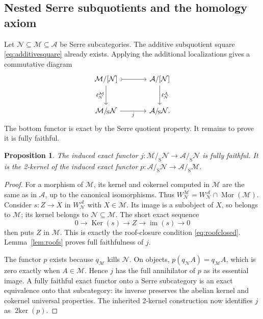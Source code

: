 \documentclass[11pt,reqno,a4paper]{amsart}
\newtheorem{proposition}[theorem]{Proposition}
\theoremstyle{definition}
\theoremstyle{remark}
\newcommand{\A}{\mathcal{A}}
\newcommand{\M}{\mathcal{M}}
\newcommand{\N}{\mathcal{N}}
\newcommand{\0}{\mathbf{0}}
\renewcommand{\1}{\mathbf{1}}
\newcommand{\twoker}{\operatorname{2ker}}
\newcommand{\aq}[2]{#1/[#2]}
\newcommand{\sq}[2]{#1/_{\!\mathrm S}#2}
\DeclareMathOperator{\Mor}{Mor}
\DeclareMathOperator{\Ker}{Ker}
\DeclareMathOperator{\im}{im}
\begin{document}
\subsection{Nested Serre subquotients and the homology axiom}

Let $\N\subseteq\M\subseteq\A$ be Serre subcategories. The
additive subquotient square \eqref{eq:additivesquare} already exists.
Applying the additional localizations gives a commutative diagram
\begin{equation}\label{eq:Serrelocdiagram}
\begin{tikzcd}[column sep=large,row sep=large]
 \aq{\M}{\N} \arrow[r,tail] \arrow[d,"\ell_{\N}^{\M}"'] &
 \aq{\A}{\N} \arrow[d,"\ell_{\N}^{\A}"]\\
 \sq{\M}{\N} \arrow[r,"j"'] & \sq{\A}{\N}.
\end{tikzcd}
\end{equation}
The bottom functor is exact by the Serre quotient property. It remains
to prove it is fully faithful.

\begin{proposition}\label{prop:Serresubquotient}
The induced exact functor
$j:\sq{\M}{\N}\to\sq{\A}{\N}$ is fully faithful. It is the
2-kernel of the induced exact functor
$p:\sq{\A}{\N}\to\sq{\A}{\M}$.
\end{proposition}
\begin{proof}
For a morphism of $\M$, its kernel and cokernel computed in $\M$
are the same as in $\A$, up to the canonical isomorphisms. Thus
$W_{\N}^{\M}=W_{\N}^{\A}\cap\Mor(\M)$.
Consider $s:Z\to X$ in $W_{\N}^{\A}$ with $X\in\M$. Its image
is a subobject of $X$, so belongs to $\M$; its kernel belongs to
$\N\subseteq\M$. The short exact sequence
\[
 0\longrightarrow\Ker(s)\longrightarrow Z
 \longrightarrow\im(s)\longrightarrow0
\]
then puts $Z$ in $\M$. This is exactly the roof-closure condition
\eqref{eq:roofclosed}. Lemma~\ref{lem:roofs} proves full faithfulness
of $j$.

The functor $p$ exists because $q_{\M}$ kills $\N$. On objects,
$p(q_{\N}A)=q_{\M}A$, which is zero exactly when $A\in\M$.
Hence $j$ has the full annihilator of $p$ as its essential image.
A fully faithful exact functor onto a Serre subcategory is an exact
equivalence onto that subcategory: its inverse preserves the abelian
kernel and cokernel universal properties. The inherited 2-kernel
construction now identifies $j$ as $\twoker(p)$.
\end{proof}
\end{document}
